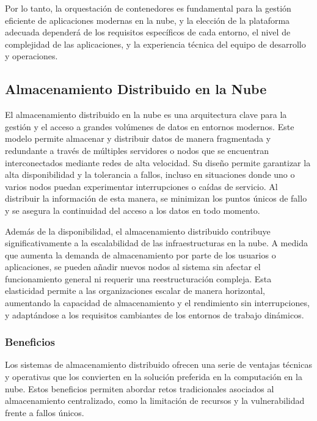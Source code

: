 {                Por lo tanto, la orquestación de contenedores es fundamental para la gestión eficiente de aplicaciones modernas en la nube, y la elección de la plataforma adecuada dependerá de los requisitos específicos de cada entorno, el nivel de complejidad de las aplicaciones, y la experiencia técnica del equipo de desarrollo y operaciones.
    
        \subsection{Almacenamiento Distribuido en la Nube}
            El almacenamiento distribuido en la nube es una arquitectura clave para la gestión y el acceso a grandes volúmenes de datos en entornos modernos. Este modelo permite almacenar y distribuir datos de manera fragmentada y redundante a través de múltiples servidores o nodos que se encuentran interconectados mediante redes de alta velocidad. Su diseño permite garantizar la alta disponibilidad y la tolerancia a fallos, incluso en situaciones donde uno o varios nodos puedan experimentar interrupciones o caídas de servicio. Al distribuir la información de esta manera, se minimizan los puntos únicos de fallo y se asegura la continuidad del acceso a los datos en todo momento.
            
            Además de la disponibilidad, el almacenamiento distribuido contribuye significativamente a la escalabilidad de las infraestructuras en la nube. A medida que aumenta la demanda de almacenamiento por parte de los usuarios o aplicaciones, se pueden añadir nuevos nodos al sistema sin afectar el funcionamiento general ni requerir una reestructuración compleja. Esta elasticidad permite a las organizaciones escalar de manera horizontal, aumentando la capacidad de almacenamiento y el rendimiento sin interrupciones, y adaptándose a los requisitos cambiantes de los entornos de trabajo dinámicos.
            
            \subsubsection{Beneficios}
                Los sistemas de almacenamiento distribuido ofrecen una serie de ventajas técnicas y operativas que los convierten en la solución preferida en la computación en la nube. Estos beneficios permiten abordar retos tradicionales asociados al almacenamiento centralizado, como la limitación de recursos y la vulnerabilidad frente a fallos únicos.
                
}
